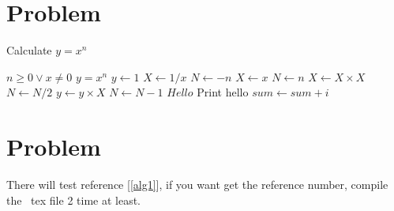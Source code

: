 \documentclass{article}
\begin{document}
\section{Problem}
\begin{algorithm}
  \caption{Calculate $y = x^n$}
  \label{alg1}
  \begin{algorithmic}[1]
  \REQUIRE $n \geq 0 \vee x \neq 0$
  \ENSURE $y = x^n$
  \STATE $y \gets 1$
  	\STATE $X \gets 1 / x$
  	\STATE $N \gets -n$
  \ELSE
  	\STATE $X \gets x$
  	\STATE $N \gets n$
  \ENDIF
  		\STATE $X \gets X \times X$
  		\STATE $N \gets N / 2$
  	\ELSE[$N$ is odd]
  		\STATE $y \gets y \times X$
  		\STATE $N \gets N - 1$
  			\State $Hello$
  		\ELSE
  			\State Print hello
  		\ENDIF
  			\State $sum \gets sum+i$
  		\ENDFOR
  	\ENDIF
  \ENDWHILE
  \end{algorithmic}
\end{algorithm}
\section{Problem}
There will test reference [\ref{alg1}], if you want get the reference number, compile the \
tex file 2 time at least.
\end{document}
